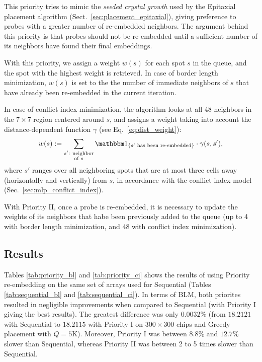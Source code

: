 This priority tries to mimic the \emph{seeded crystal growth} used by the
Epitaxial placement algorithm (Sect.~\ref{sec:placement_epitaxial}), giving
preference to probes with a greater number of re-embedded neighbors. The
argument behind this priority is that probes should not be re-embedded until a
sufficient number of its neighbors have found their final embeddings.

With this priority, we assign a weight $w(s)$ for each spot $s$ in the queue,
and the spot with the highest weight is retrieved. In case of border length
minimization, $w(s)$ is set to the the number of immediate neighbors of $s$ that
have already been re-embedded in the current iteration.

In case of conflict index minimization, the algorithm looks at all 48 neighbors
in the $7\times 7$ region centered around $s$, and assigns a weight taking into
account the distance-dependent function $\gamma$ (see Eq.~\ref{eq:dist_weight}):
\[
w(s) := \sum_{\substack{s'\text{: neighbor}\\\text{of } s}}
        \Ind{s'\text{ has been re-embedded}}
        \cdot \gamma(s,s'),
\]
where $s'$ ranges over all neighboring spots that are at most three cells away
(horizontally and vertically) from $s$, in accordance with the conflict index
model (Sec.~\ref{sec:mlp_conflict_index}).

With Priority II, once a probe is re-embedded, it is necessary to update the
weights of its neighbors that habe been previously added to the queue (up to 4
with border length minimization, and 48 with conflict index minimization).

\subsection{Results}

Tables \ref{tab:priority_bl} and \ref{tab:priority_ci} shows the results of
using Priority re-embedding on the same set of arrays used for Sequential
(Tables \ref{tab:sequential_bl} and \ref{tab:sequential_ci}). In terms of BLM,
both priorites resulted in negligible improvements when compared to Sequential
(with Priority I giving the best results). The greatest difference was only
$0.0032\%$ (from $18.2121$ with Sequential to $18.2115$ with Priority I on
$300\times 300$ chips and Greedy placement with $Q=5$K). Moreover, Priority I
was between $8.8\%$ and $12.7\%$ slower than Sequential, whereas Priority II was
between 2 to 5 times slower than Sequential.

